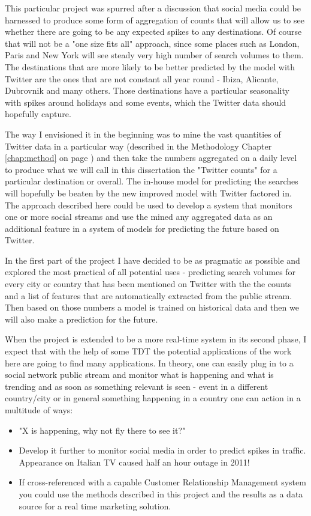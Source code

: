 \documentclass[minf,frontabs,twoside,singlespacing,parskip]{infthesis}
\begin{document}
This particular project was spurred after a discussion that social media could be harnessed to produce some form of aggregation of counts that will allow us to see whether there are going to be any expected spikes to any destinations. Of course that will not be a "one size fits all" approach, since some places such as London, Paris and New York will see steady very high number of search volumes to them. The destinations that are more likely to be better predicted by the model with Twitter are the ones that are not constant all year round - Ibiza, Alicante, Dubrovnik and many others. Those destinations have a particular seasonality with spikes around holidays and some events, which the Twitter data should hopefully capture.


The way I envisioned it in the beginning was to mine the vast quantities of Twitter data in a particular way (described in the Methodology Chapter \ref{chap:method} on page \pageref{chap:method}) and then take the numbers aggregated on a daily level to produce what we will call in this dissertation the "Twitter counts" for a particular destination or overall. The in-house model for predicting the searches will hopefully be beaten by the new improved model with Twitter factored in. The approach described here could be used to develop a system that monitors one or more social streams and use the mined any aggregated data as an additional feature in a system of models for predicting the future based on Twitter.


In the first part of the project I have decided to be as pragmatic as possible and explored the most practical of all potential uses - predicting search volumes for every city or country that has been mentioned on Twitter with the the counts and a list of features that are automatically extracted from the public stream. Then based on those numbers a model is trained on historical data and then we will also make a prediction for the future. 


When the project is extended to be a more real-time system in its second phase, I expect that with the help of some TDT the potential applications of the work here are going to find many applications. In theory, one can easily plug in to a social network public stream and monitor what is happening and what is trending and as soon as something relevant is seen - event in a different country/city or in general something happening in a country one can action in a multitude of ways:

\begin{itemize}
\item "X is happening, why not fly there to see it?"
\item Develop it further to monitor social media in order to predict spikes in traffic. Appearance on Italian TV caused half an hour outage in 2011!
\item If cross-referenced with a capable Customer Relationship Management system you could use the methods described in this project and the results as a data source for a real time marketing solution.
\end{itemize}
\end{document}

